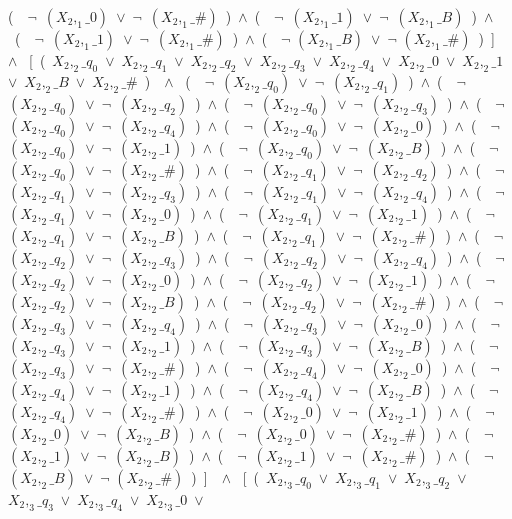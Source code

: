 ﻿\documentclass[a4paper,10pt]{article}
\begin{document}
(\ \ $\neg$\ $(X_2,_1\_0)$\ $\vee$\ $\neg$\ $(X_2,_1\_\#)$\ )\ $\wedge$\ (\ \ $\neg$\ $(X_2,_1\_1)$\ $\vee$\ $\neg$\ $(X_2,_1\_B)$\ )\ $\wedge$\ (\ \ $\neg$\ $(X_2,_1\_1)$\ $\vee$\ $\neg$\ $(X_2,_1\_\#)$\ )\ $\wedge$\ (\ \ $\neg$ $(X_2,_1\_B)$\ $\vee$\ $\neg$ $(X_2,_1\_\#)$\ )\ ]\ \ $\wedge$ \ [\ (\ $X_2,_2\_q_0$\ $\vee$\ $X_2,_2\_q_1$\ $\vee$\ $X_2,_2\_q_2$\ $\vee$\ $X_2,_2\_q_3$\ $\vee$\ $X_2,_2\_q_4$\ $\vee$\ $X_2,_2\_0$\ $\vee$\ $X_2,_2\_1$\ $\vee$\ $X_2,_2\_B$\ $\vee$\ $X_2,_2\_\#$\ )\ \ $\wedge$ \ (\ \ $\neg$\ $(X_2,_2\_q_0)$\ $\vee$\ $\neg$\ $(X_2,_2\_q_1)$\ )\ $\wedge$\ (\ \ $\neg$\ $(X_2,_2\_q_0)$\ $\vee$\ $\neg$\ $(X_2,_2\_q_2)$\ )\ $\wedge$\ (\ \ $\neg$\ $(X_2,_2\_q_0)$\ $\vee$\ $\neg$\ $(X_2,_2\_q_3)$\ )\ $\wedge$\ (\ \ $\neg$\ $(X_2,_2\_q_0)$\ $\vee$\ $\neg$\ $(X_2,_2\_q_4)$\ )\ $\wedge$\ (\ \ $\neg$\ $(X_2,_2\_q_0)$\ $\vee$\ $\neg$\ $(X_2,_2\_0)$\ )\ $\wedge$\ (\ \ $\neg$\ $(X_2,_2\_q_0)$\ $\vee$\ $\neg$\ $(X_2,_2\_1)$\ )\ $\wedge$\ (\ \ $\neg$\ $(X_2,_2\_q_0)$\ $\vee$\ $\neg$\ $(X_2,_2\_B)$\ )\ $\wedge$\ (\ \ $\neg$\ $(X_2,_2\_q_0)$\ $\vee$\ $\neg$\ $(X_2,_2\_\#)$\ )\ $\wedge$\ (\ \ $\neg$\ $(X_2,_2\_q_1)$\ $\vee$\ $\neg$\ $(X_2,_2\_q_2)$\ )\ $\wedge$\ (\ \ $\neg$\ $(X_2,_2\_q_1)$\ $\vee$\ $\neg$\ $(X_2,_2\_q_3)$\ )\ $\wedge$\ (\ \ $\neg$\ $(X_2,_2\_q_1)$\ $\vee$\ $\neg$\ $(X_2,_2\_q_4)$\ )\ $\wedge$\ (\ \ $\neg$\ $(X_2,_2\_q_1)$\ $\vee$\ $\neg$\ $(X_2,_2\_0)$\ )\ $\wedge$\ (\ \ $\neg$\ $(X_2,_2\_q_1)$\ $\vee$\ $\neg$\ $(X_2,_2\_1)$\ )\ $\wedge$\ (\ \ $\neg$\ $(X_2,_2\_q_1)$\ $\vee$\ $\neg$\ $(X_2,_2\_B)$\ )\ $\wedge$\ (\ \ $\neg$\ $(X_2,_2\_q_1)$\ $\vee$\ $\neg$\ $(X_2,_2\_\#)$\ )\ $\wedge$\ (\ \ $\neg$\ $(X_2,_2\_q_2)$\ $\vee$\ $\neg$\ $(X_2,_2\_q_3)$\ )\ $\wedge$\ (\ \ $\neg$\ $(X_2,_2\_q_2)$\ $\vee$\ $\neg$\ $(X_2,_2\_q_4)$\ )\ $\wedge$\ (\ \ $\neg$\ $(X_2,_2\_q_2)$\ $\vee$\ $\neg$\ $(X_2,_2\_0)$\ )\ $\wedge$\ (\ \ $\neg$\ $(X_2,_2\_q_2)$\ $\vee$\ $\neg$\ $(X_2,_2\_1)$\ )\ $\wedge$\ (\ \ $\neg$\ $(X_2,_2\_q_2)$\ $\vee$\ $\neg$\ $(X_2,_2\_B)$\ )\ $\wedge$\ (\ \ $\neg$\ $(X_2,_2\_q_2)$\ $\vee$\ $\neg$\ $(X_2,_2\_\#)$\ )\ $\wedge$\ (\ \ $\neg$\ $(X_2,_2\_q_3)$\ $\vee$\ $\neg$\ $(X_2,_2\_q_4)$\ )\ $\wedge$\ (\ \ $\neg$\ $(X_2,_2\_q_3)$\ $\vee$\ $\neg$\ $(X_2,_2\_0)$\ )\ $\wedge$\ (\ \ $\neg$\ $(X_2,_2\_q_3)$\ $\vee$\ $\neg$\ $(X_2,_2\_1)$\ )\ $\wedge$\ (\ \ $\neg$\ $(X_2,_2\_q_3)$\ $\vee$\ $\neg$\ $(X_2,_2\_B)$\ )\ $\wedge$\ (\ \ $\neg$\ $(X_2,_2\_q_3)$\ $\vee$\ $\neg$\ $(X_2,_2\_\#)$\ )\ $\wedge$\ (\ \ $\neg$\ $(X_2,_2\_q_4)$\ $\vee$\ $\neg$\ $(X_2,_2\_0)$\ )\ $\wedge$\ (\ \ $\neg$\ $(X_2,_2\_q_4)$\ $\vee$\ $\neg$\ $(X_2,_2\_1)$\ )\ $\wedge$\ (\ \ $\neg$\ $(X_2,_2\_q_4)$\ $\vee$\ $\neg$\ $(X_2,_2\_B)$\ )\ $\wedge$\ (\ \ $\neg$\ $(X_2,_2\_q_4)$\ $\vee$\ $\neg$\ $(X_2,_2\_\#)$\ )\ $\wedge$\ (\ \ $\neg$\ $(X_2,_2\_0)$\ $\vee$\ $\neg$\ $(X_2,_2\_1)$\ )\ $\wedge$\ (\ \ $\neg$\ $(X_2,_2\_0)$\ $\vee$\ $\neg$\ $(X_2,_2\_B)$\ )\ $\wedge$\ (\ \ $\neg$\ $(X_2,_2\_0)$\ $\vee$\ $\neg$\ $(X_2,_2\_\#)$\ )\ $\wedge$\ (\ \ $\neg$\ $(X_2,_2\_1)$\ $\vee$\ $\neg$\ $(X_2,_2\_B)$\ )\ $\wedge$\ (\ \ $\neg$\ $(X_2,_2\_1)$\ $\vee$\ $\neg$\ $(X_2,_2\_\#)$\ )\ $\wedge$\ (\ \ $\neg$ $(X_2,_2\_B)$\ $\vee$\ $\neg$ $(X_2,_2\_\#)$\ )\ ]\ \ $\wedge$ \ [\ (\ $X_2,_3\_q_0$\ $\vee$\ $X_2,_3\_q_1$\ $\vee$\ $X_2,_3\_q_2$\ $\vee$\ $X_2,_3\_q_3$\ $\vee$\ $X_2,_3\_q_4$\ $\vee$\ $X_2,_3\_0$\ $\vee$\ 
\end{document}
